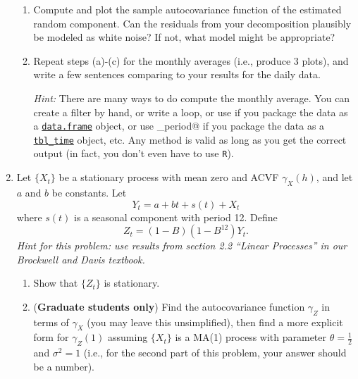 \documentclass[10pt, letterpaper]{scrartcl}
\newcommand{\<}{\langle}  %
\renewcommand{\>}{\rangle}%
\newcommand{\RR}{\texttt{R}\xspace}
\begin{document}
\begin{enumerate}[align=left, leftmargin=*, label=\sffamily\bfseries Problem \arabic*:]
\begin{enumerate}
  \item
    Compute and plot the sample autocovariance function of the estimated random 
    component.  Can the residuals from your decomposition plausibly be modeled as 
    white noise?  If not, what model might be appropriate?
    

  \item
    Repeat steps (a)-(c) for the monthly averages (i.e., produce 3 plots), and write a few sentences comparing to your results for 
    the daily data.
    
    {\em Hint:} There are many ways to do compute the monthly average. You can create a filter by hand, or write a \verb@for@ loop, or use 
    \verb@aggregate@ if you package the data as a \href{https://www.rdocumentation.org/packages/base/versions/3.6.2/topics/data.frame}{\texttt{data.frame}} object, or use \verb@as_period@ if you package the data as a \href{https://www.rdocumentation.org/packages/tibbletime/versions/0.1.6/topics/as_tbl_time}{\texttt{tbl\_time}} object, etc.  Any method is valid as long as you get the correct output (in fact, you don't even have to use \RR).
    
    
\end{enumerate}

\item 
Let $\{X_t\}$ be a stationary process with mean zero and ACVF $\gamma_X(h)$, 
and let $a$ and $b$ be constants.  Let 
\[
  Y_t = a + bt + s(t) + X_t
\]
where $s(t)$ is a seasonal component with period 12.  Define 
\[
Z_t = (1-B)(1-B^{12})Y_t.
\]
{\em Hint for this problem: use results from section 2.2 ``Linear Processes'' in our Brockwell and Davis textbook.}
\begin{enumerate}
\item Show that $\{Z_t\}$ is stationary.

\item (\textbf{\sffamily Graduate students only}) Find the autocovariance function $\gamma_Z$ in terms of $\gamma_X$ (you may leave this unsimplified), then find a more explicit form for $\gamma_Z(1)$ assuming $\{X_t\}$ is a MA(1) process with parameter $\theta=\frac12$ and $\sigma^2=1$ (i.e., for the second part of this problem, your answer should be a number).
\end{enumerate}

\end{enumerate}
\end{document}

